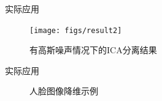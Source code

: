 \documentclass{beamer}
\begin{document}
\begin{frame}{实际应用}
\begin{figure}[h]
    \centering
    \texttt{[image: figs/result2]}
    \caption{有高斯噪声情况下的ICA分离结果}
    \label{fig:result2}
\end{figure}
\end{frame}

\begin{frame}{实际应用}
\begin{figure}[h]
    \centering
    \hspace{0.2in}
    \hspace{0.2in}
    \caption{人脸图像降维示例}
    \label{fig:face}
\end{figure}
\end{frame}
\end{document}
